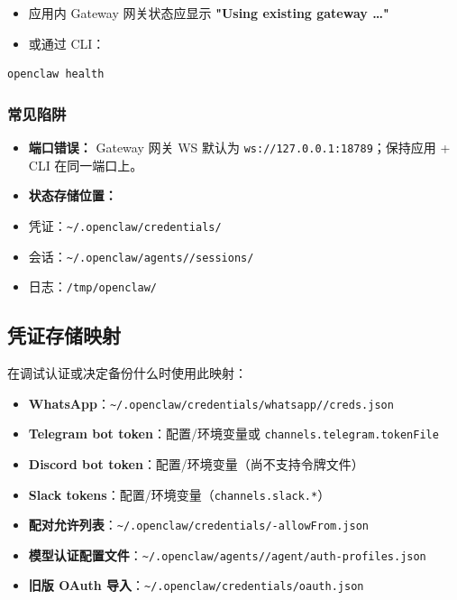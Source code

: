 \begin{itemize}
  \item 应用内 Gateway 网关状态应显示 \textbf{"Using existing gateway …"}
  \item 或通过 CLI：
\end{itemize}


\begin{lstlisting}[language=bash]
openclaw health
\end{lstlisting}


\subsubsection{常见陷阱}


\begin{itemize}
  \item \textbf{端口错误：} Gateway 网关 WS 默认为 \texttt{ws://127.0.0.1:18789}；保持应用 + CLI 在同一端口上。
  \item \textbf{状态存储位置：}
  \item 凭证：\texttt{\textasciitilde{}/.openclaw/credentials/}
  \item 会话：\texttt{\textasciitilde{}/.openclaw/agents//sessions/}
  \item 日志：\texttt{/tmp/openclaw/}
\end{itemize}


\subsection{凭证存储映射}


在调试认证或决定备份什么时使用此映射：

\begin{itemize}
  \item \textbf{WhatsApp}：\texttt{\textasciitilde{}/.openclaw/credentials/whatsapp//creds.json}
  \item \textbf{Telegram bot token}：配置/环境变量或 \texttt{channels.telegram.tokenFile}
  \item \textbf{Discord bot token}：配置/环境变量（尚不支持令牌文件）
  \item \textbf{Slack tokens}：配置/环境变量（\texttt{channels.slack.*}）
  \item \textbf{配对允许列表}：\texttt{\textasciitilde{}/.openclaw/credentials/-allowFrom.json}
  \item \textbf{模型认证配置文件}：\texttt{\textasciitilde{}/.openclaw/agents//agent/auth-profiles.json}
  \item \textbf{旧版 OAuth 导入}：\texttt{\textasciitilde{}/.openclaw/credentials/oauth.json}
\end{itemize}

